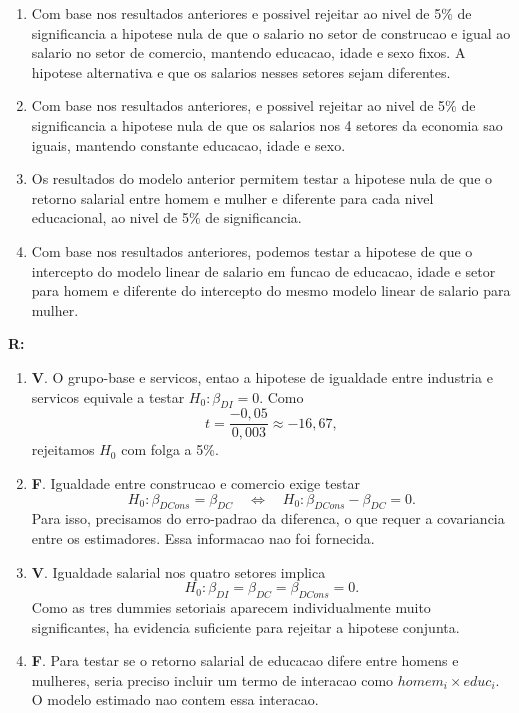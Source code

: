 \documentclass[12pt,letterpaper, onecolumn]{exam}
\renewenvironment{solution}
  {\par\noindent\textbf{R:}\enspace\color{blue}}
  {\par\color{black}}
\begin{document}
\begin{questions}
\begin{enumerate}[label=(\arabic*)]
    \item Com base nos resultados anteriores e possivel rejeitar ao nivel de 5\% de significancia a hipotese nula de que o salario no setor de construcao e igual ao salario no setor de comercio, mantendo educacao, idade e sexo fixos. A hipotese alternativa e que os salarios nesses setores sejam diferentes.

    \item Com base nos resultados anteriores, e possivel rejeitar ao nivel de 5\% de significancia a hipotese nula de que os salarios nos 4 setores da economia sao iguais, mantendo constante educacao, idade e sexo.

    \item Os resultados do modelo anterior permitem testar a hipotese nula de que o retorno salarial entre homem e mulher e diferente para cada nivel educacional, ao nivel de 5\% de significancia.

    \item Com base nos resultados anteriores, podemos testar a hipotese de que o intercepto do modelo linear de salario em funcao de educacao, idade e setor para homem e diferente do intercepto do mesmo modelo linear de salario para mulher.
\end{enumerate}

\begin{solution}
\begin{enumerate}[label=(\arabic*)]
    \item \textbf{V}. O grupo-base e servicos, entao a hipotese de igualdade entre industria e servicos equivale a testar \(H_0:\beta_{DI}=0\). Como
    \[
    t=\frac{-0,05}{0,003}\approx -16,67,
    \]
    rejeitamos \(H_0\) com folga a 5\%.

    \item \textbf{F}. Igualdade entre construcao e comercio exige testar
    \[
    H_0:\beta_{DCons}=\beta_{DC}
    \quad \Leftrightarrow \quad
    H_0:\beta_{DCons}-\beta_{DC}=0.
    \]
    Para isso, precisamos do erro-padrao da diferenca, o que requer a covariancia entre os estimadores. Essa informacao nao foi fornecida.

    \item \textbf{V}. Igualdade salarial nos quatro setores implica
    \[
    H_0:\beta_{DI}=\beta_{DC}=\beta_{DCons}=0.
    \]
    Como as tres dummies setoriais aparecem individualmente muito significantes, ha evidencia suficiente para rejeitar a hipotese conjunta.

    \item \textbf{F}. Para testar se o retorno salarial de educacao difere entre homens e mulheres, seria preciso incluir um termo de interacao como \(homem_i \times educ_i\). O modelo estimado nao contem essa interacao.


\end{enumerate}
\end{solution}
\end{questions}
\end{document}

